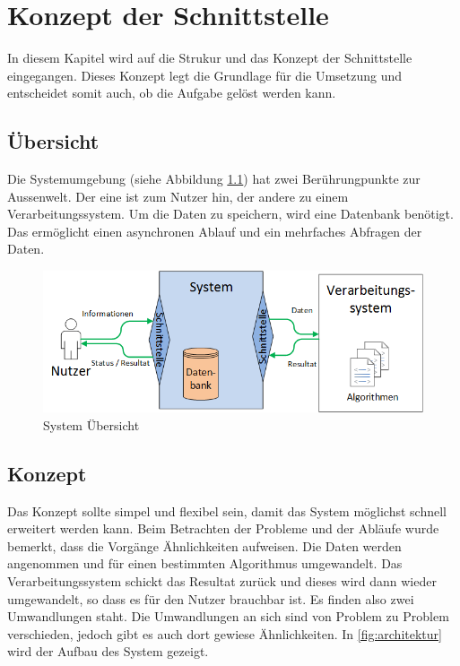%
%

\chapter{Konzept der Schnittstelle \resultAssignment{[R4]}}\label{chap.architektur}
In diesem Kapitel wird auf die Strukur und das Konzept der Schnittstelle eingegangen. Dieses Konzept legt die Grundlage für die Umsetzung und entscheidet somit auch, ob die 
Aufgabe gelöst werden kann.

\section{Übersicht}\label{architektur_uebersicht}
Die Systemumgebung (siehe Abbildung \ref{fig:system_scope}) hat zwei Berührungpunkte zur Aussenwelt. Der eine ist zum Nutzer hin, der andere zu einem Verarbeitungssystem. 
Um die Daten zu speichern, wird eine Datenbank benötigt. Das ermöglicht einen asynchronen Ablauf und ein mehrfaches Abfragen der Daten.
\begin{figure}[h]
\centering
\includegraphics[scale=0.8]{images/visio/SystemScope.png}
\caption[System Übersicht]{System Übersicht \selfmade{}}
\label{fig:system_scope}
\end{figure}

\section{Konzept}\label{arch_backend}
Das Konzept sollte simpel und flexibel sein, damit das System möglichst schnell erweitert werden kann. Beim Betrachten der Probleme und der Abläufe wurde bemerkt, dass die Vorgänge 
Ähnlichkeiten aufweisen. Die Daten werden angenommen und für einen bestimmten Algorithmus umgewandelt. Das Verarbeitungssystem schickt das Resultat zurück und dieses wird dann 
wieder umgewandelt, so dass es für den Nutzer brauchbar ist. Es finden also zwei Umwandlungen staht. Die Umwandlungen an sich sind von Problem zu Problem verschieden, jedoch gibt es 
auch dort gewiese Ähnlichkeiten. In \autoref{fig:architektur} wird der Aufbau des System gezeigt.

